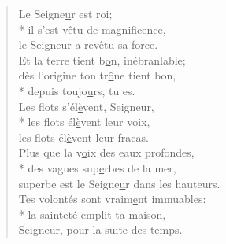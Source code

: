 \begin{verse}
Le Seigne\underline{u}r est roi; \\*
il s’est vêt\underline{u} de magnificence, \\
le Seigneur a revêt\underline{u} sa force. \\

Et la terre tient b\underline{o}n, inébranlable; \\
dès l’origine ton tr\underline{ô}ne tient bon, \\*
depuis toujo\underline{u}rs, tu es. \\

Les flots s’él\underline{è}vent, Seigneur, \\*
les flots él\underline{è}vent leur voix, \\
les flots él\underline{è}vent leur fracas. \\

Plus que la v\underline{o}ix des eaux profondes, \\*
des vagues sup\underline{e}rbes de la mer, \\
superbe est le Seigne\underline{u}r dans les hauteurs. \\

Tes volontés sont vraim\underline{e}nt immuables: \\*
la sainteté empl\underline{i}t ta maison, \\
Seigneur, pour la su\underline{i}te des temps. \\
\end{verse}

